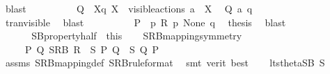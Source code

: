 \begin{isabellebody}
\ blast\isanewline
\ \ \ \ \ \ \ \ \isamarkupfalse%
\ {\isacartoucheopen}Q\ {\isacharequal}{\kern0pt}\ {\isasymtheta}{\isacharbrackleft}{\kern0pt}X{\isacharbrackright}{\kern0pt}{\isacharparenleft}{\kern0pt}q{\isacharparenright}{\kern0pt}{\isacartoucheclose}\ {\isacartoucheopen}X\ {\isasymsubseteq}\ visible{\isacharunderscore}{\kern0pt}actions{\isacartoucheclose}\ {\isacartoucheopen}a\ {\isasymin}\ X{\isacartoucheclose}\ \isamarkupfalse%
\ {\isacartoucheopen}Q\ {\isasymlongmapsto}\isactrlsup {\isasymtheta}a\ {\isasymtheta}{\isacharparenleft}{\kern0pt}q{\isacharprime}{\kern0pt}{\isacharparenright}{\kern0pt}{\isacartoucheclose}\isanewline
\ \ \ \ \ \ \ \ \ \ \isamarkupfalse%
\ tran{\isacharunderscore}{\kern0pt}visible\ \isamarkupfalse%
\ blast\isanewline
\ \ \ \ \ \ \ \ \isamarkupfalse%
\ {\isacartoucheopen}P{\isacharprime}{\kern0pt}\ {\isacharequal}{\kern0pt}\ {\isasymtheta}{\isacharparenleft}{\kern0pt}p{\isacharprime}{\kern0pt}{\isacharparenright}{\kern0pt}{\isacartoucheclose}\ {\isacartoucheopen}R\ p{\isacharprime}{\kern0pt}\ None\ q{\isacharprime}{\kern0pt}{\isacartoucheclose}\ \isamarkupfalse%
\ {\isacharquery}{\kern0pt}thesis\ \isamarkupfalse%
\ blast\isanewline
\ \ \ \ \ \ \isamarkupfalse%
\isanewline
\ \ \ \ \isamarkupfalse%
\isanewline
\ \ \isacommand{{\isacharbraceright}{\kern0pt}}\isamarkupfalse%
\isanewline
\ \ \isamarkupfalse%
\ SB{\isacharunderscore}{\kern0pt}property{\isacharunderscore}{\kern0pt}half\ {\isacharequal}{\kern0pt}\ this\isanewline
\isanewline
\ \ \isamarkupfalse%
\ SRB{\isacharunderscore}{\kern0pt}mapping{\isacharunderscore}{\kern0pt}symmetry{\isacharcolon}{\kern0pt}\ \isanewline
\ \ \ \ {\isacartoucheopen}{\isasymAnd}\ P\ Q{\isachardot}{\kern0pt}\ SRB\ R\ {\isasymand}\ {\isacharquery}{\kern0pt}S\ P\ Q\ {\isasymLongrightarrow}\ {\isacharquery}{\kern0pt}S\ Q\ P{\isacartoucheclose}\isanewline
\ \ \ \ \isamarkupfalse%
\ assms\ SRB{\isacharunderscore}{\kern0pt}mapping{\isacharunderscore}{\kern0pt}def\ SRB{\isacharunderscore}{\kern0pt}ruleformat{\isacharparenleft}{\kern0pt}{}{\isacharparenright}{\kern0pt}\ \isamarkupfalse%
\ {\isacharparenleft}{\kern0pt}smt\ {\isacharparenleft}{\kern0pt}verit{\isacharcomma}{\kern0pt}\ best{\isacharparenright}{\kern0pt}{\isacharparenright}{\kern0pt}\isanewline
\isanewline
\ \ \isamarkupfalse%
\ {\isacartoucheopen}lts{\isacharunderscore}{\kern0pt}theta{\isachardot}{\kern0pt}SB\ {\isacharquery}{\kern0pt}S{\isacartoucheclose}\ \isamarkupfalse%

\end{isabellebody}
